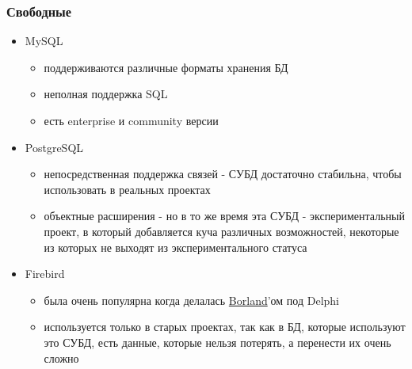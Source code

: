 \subsubsection{Свободные}
\begin{itemize}
	\item MySQL
	      \begin{itemize}
		      \item поддерживаются различные форматы хранения БД
		      \item неполная поддержка SQL
		      \item есть enterprise и community версии
	      \end{itemize}
	\item PostgreSQL
	      \begin{itemize}
		      \item непосредственная поддержка связей - СУБД достаточно стабильна, чтобы использовать в реальных проектах
		      \item объектные расширения - но в то же время эта СУБД - экспериментальный проект, в который добавляется куча различных возможностей, некоторые из которых не выходят из экспериментального статуса
	      \end{itemize}
	\item Firebird
	      \begin{itemize}
		      \item была очень популярна когда делалась \href{https://en.wikipedia.org/wiki/Borland}{Borland}'ом под Delphi
		      \item используется только в старых проектах, так как в БД, которые используют это СУБД, есть данные, которые нельзя потерять, а перенести их очень сложно
	      \end{itemize}
\end{itemize}

